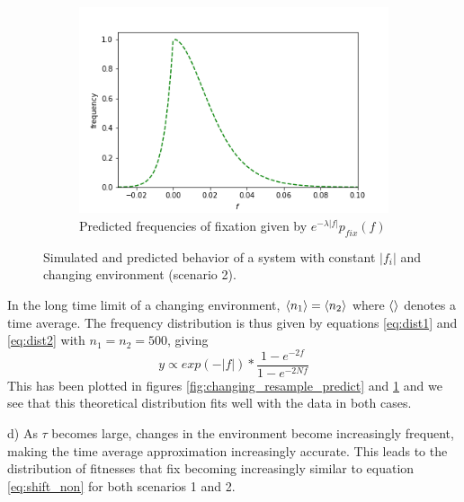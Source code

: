 \documentclass{article}
\begin{document}
\begin{figure}[h]
\begin{subfigure}[t]{0.305\linewidth}
		\centering
		\includegraphics[width = 1.0\linewidth, trim={5 5 40 30}, clip=true]{figures/no_n_combined_dists.png}
		\caption{Predicted frequencies of fixation given by $e^{-\lambda |f|} p_{fix}(f)$}
		\label{fig:changing_constant_predict}
	\end{subfigure}
\caption{Simulated and predicted behavior of a system with constant $|f_i|$ and changing environment (scenario 2).}
\label{fig:changing_constant}
\end{figure}

In the long time limit of a changing environment, $\braket{n_1} = \braket{n_2}$ where $\braket{}$ denotes a time average. The frequency distribution is thus given by equations \ref{eq:dist1} and \ref{eq:dist2} with $n_1 = n_2 = 500$, giving
\begin{equation}\label{eq:shift_non}
y \propto exp(-|f|) * \dfrac{1- e^{-2 f}}{1- e^{-2 N f}}
\end{equation}
This has been plotted in figures \ref{fig:changing_resample_predict} and \ref{fig:changing_constant_predict} and we see that this theoretical distribution fits well with the data in both cases.

d)
As $\tau$ becomes large, changes in the environment become increasingly frequent, making the time average approximation increasingly accurate. This leads to the distribution of fitnesses that fix becoming increasingly similar to equation \ref{eq:shift_non} for both scenarios 1 and 2.
\end{document}
